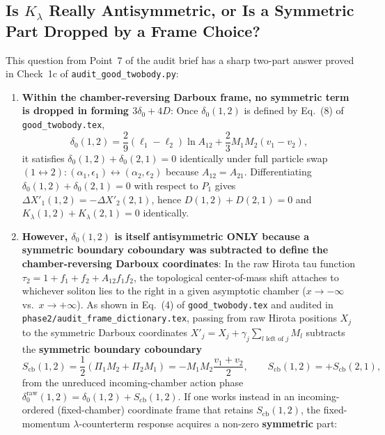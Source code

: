 \documentclass[11pt,a4paper]{article}
\begin{document}
\subsection{Is $K_\lambda$ Really Antisymmetric, or Is a Symmetric Part Dropped by a Frame Choice?}

This question from Point~7 of the audit brief has a sharp two-part answer proved in Check~1c of \texttt{audit\_good\_twobody.py}:

\begin{enumerate}
\item \textbf{Within the chamber-reversing Darboux frame, no symmetric term is dropped in forming $3\delta_0 + 4D$}: Once $\delta_0(1,2)$ is defined by Eq.~(8) of \texttt{good\_twobody.tex},
\begin{equation}
\delta_0(1,2) = \frac{2}{9}(\ell_1 - \ell_2)\ln A_{12} + \frac{2}{3}M_1 M_2(v_1 - v_2),
\end{equation}
it satisfies $\delta_0(1,2) + \delta_0(2,1) = 0$ identically under full particle swap $(1 \leftrightarrow 2) : (\alpha_1,\epsilon_1) \leftrightarrow (\alpha_2,\epsilon_2)$ because $A_{12} = A_{21}$. Differentiating $\delta_0(1,2) + \delta_0(2,1) = 0$ with respect to $P_1$ gives $\Delta X'_1(1,2) = -\Delta X'_2(2,1)$, hence $D(1,2) + D(2,1) = 0$ and $K_\lambda(1,2) + K_\lambda(2,1) = 0$ identically.
\item \textbf{However, $\delta_0(1,2)$ is itself antisymmetric ONLY because a symmetric boundary coboundary was subtracted to define the chamber-reversing Darboux coordinates}: In the raw Hirota tau function $\tau_2 = 1 + f_1 + f_2 + A_{12}f_1 f_2$, the topological center-of-mass shift attaches to whichever soliton lies to the right in a given asymptotic chamber ($x \to -\infty$ vs.\ $x \to +\infty$). As shown in Eq.~(4) of \texttt{good\_twobody.tex} and audited in \texttt{phase2/audit\_frame\_dictionary.tex}, passing from raw Hirota positions $X_j$ to the symmetric Darboux coordinates $X'_j = X_j + \gamma_j\sum_{l\text{ left of }j} M_l$ subtracts the \textbf{symmetric boundary coboundary}
\begin{equation}
S_{\mathrm{cb}}(1,2) = \frac{1}{2}(\Pi_1 M_2 + \Pi_2 M_1) = -M_1 M_2\frac{v_1 + v_2}{2}, \qquad S_{\mathrm{cb}}(1,2) = +S_{\mathrm{cb}}(2,1),
\end{equation}
from the unreduced incoming-chamber action phase $\delta_0^{\mathrm{raw}}(1,2) = \delta_0(1,2) + S_{\mathrm{cb}}(1,2)$. If one works instead in an incoming-ordered (fixed-chamber) coordinate frame that retains $S_{\mathrm{cb}}(1,2)$, the fixed-momentum $\lambda$-counterterm response acquires a non-zero \textbf{symmetric} part:

\end{enumerate}
\end{document}
